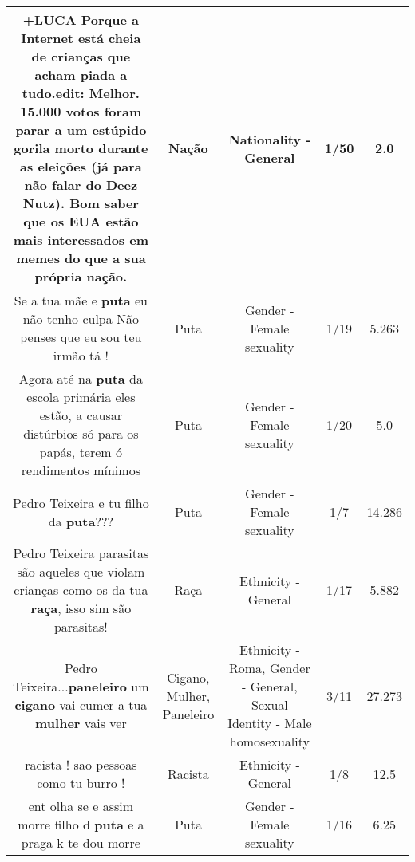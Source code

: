 \documentclass[11pt]{article}
\newlength\mylength
\begin{document}
\begin{center}
\begin{longtable}{|C{.65\mylength}|C{.30\mylength}|C{.12\mylength}|C{.12\mylength}|C{.12\mylength}|}
  \small +LUCA Porque a Internet está cheia de crianças que acham piada a tudo.edit: Melhor. 15.000 votos foram parar a um estúpido gorila morto durante as eleições (já para não falar do Deez Nutz). Bom saber que os EUA estão mais interessados em memes do que a sua própria \textbf{nação}.\normalsize   & Nação & Nationality - General & 1/50 & 2.0 \\  \hline
  \small Se a tua mãe e \textbf{puta} eu não tenho culpa Não penses que eu sou teu irmão tá !\normalsize   & Puta & Gender - Female sexuality & 1/19 & 5.263 \\  \hline
  \small Agora até na \textbf{puta} da escola primária eles estão, a causar distúrbios só para os papás, terem ó rendimentos mínimos\normalsize   & Puta & Gender - Female sexuality & 1/20 & 5.0 \\  \hline
  \small Pedro Teixeira e tu filho da \textbf{puta}???\normalsize   & Puta & Gender - Female sexuality & 1/7 & 14.286 \\  \hline
  \small Pedro Teixeira parasitas são aqueles que violam crianças como os da tua \textbf{raça}, isso sim são parasitas!\normalsize   & Raça & Ethnicity - General & 1/17 & 5.882 \\  \hline
  \small Pedro Teixeira...\textbf{paneleiro} um \textbf{cigano} vai cumer a tua \textbf{mulher} vais ver\normalsize   & Cigano, Mulher, Paneleiro & Ethnicity - Roma, Gender - General, Sexual Identity - Male homosexuality & 3/11 & 27.273 \\  \hline
  \small racista ! sao pessoas como tu burro !\normalsize   & Racista & Ethnicity - General & 1/8 & 12.5 \\  \hline
  \small ent olha se e assim morre filho d \textbf{puta} e a praga k te dou morre\normalsize   & Puta & Gender - Female sexuality & 1/16 & 6.25 \\  \hline

\end{longtable}
\end{center}
\end{document}
